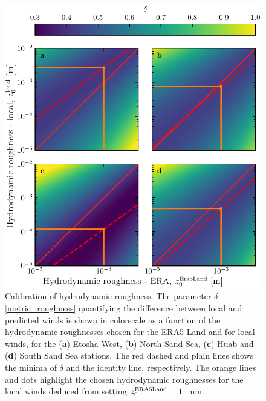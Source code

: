 \begin{figure}[p]
\centering
\includegraphics[scale=1]{Figures/Figure3_supp.pdf}
\caption{Calibration of hydrodynamic roughness. The parameter $\delta$ \eqref{metric_roughness} quantifying the difference between local and predicted winds is shown in colorscale as a function of the hydrodynamic roughnesses chosen for the ERA5-Land and for local winds, for the (\textbf{a}) Etosha West, (\textbf{b}) North Sand Sea, (\textbf{c}) Huab and (\textbf{d}) South Sand Sea stations. The red dashed and plain lines shows the minima of $\delta$ and the identity line, respectively. The orange lines and dots highlight the chosen hydrodynamic roughnesses for the local winds deduced from setting $z_{0}^{\textup{ERA5Land}} = 1$~mm.}
\label{Fig3_supp}
\end{figure}

